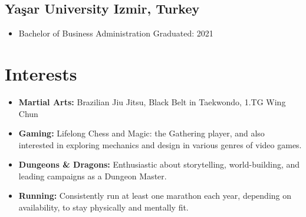 \documentclass[11pt]{article}
\newcommand{\rside}[1]{
  \hfill {\normalfont\color{accent} #1}%
}
\begin{document}
\subsection{Yaşar University \rside{Izmir, Turkey}}
\begin{itemize}
    \item{Bachelor of Business Administration \rside{Graduated: 2021}}
\end{itemize}
\section{Interests}
\begin{itemize}
    \item \textbf{Martial Arts:} Brazilian Jiu Jitsu, Black Belt in Taekwondo, 1.TG Wing Chun
    \item \textbf{Gaming:} Lifelong Chess and Magic: the Gathering player, and also interested in exploring mechanics and design in various genres of video games.
    \item \textbf{Dungeons \& Dragons:} Enthusiastic about storytelling, world-building, and leading campaigns as a Dungeon Master.
    \item \textbf{Running:} Consistently run at least one marathon each year, depending on availability, to stay physically and mentally fit.
\end{itemize}
\end{document}
